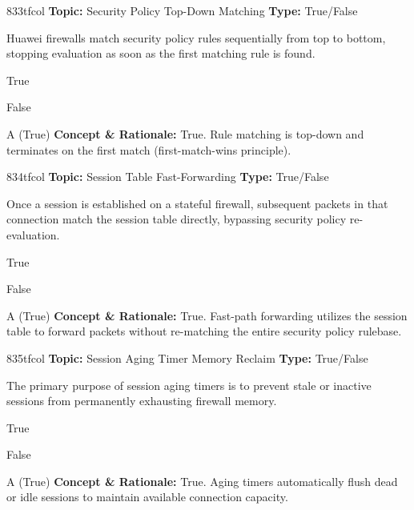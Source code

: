 \begin{qcard}{833}{tfcol}
\textcolor{darkslate!75}{\small\textbf{Topic:} Security Policy Top-Down Matching \hfill \textbf{Type:} True/False}\vspace{0.4em}\par
Huawei firewalls match security policy rules sequentially from top to bottom, stopping evaluation as soon as the first matching rule is found.
\begin{qoptions}
\item True
\item False
\end{qoptions}
\end{qcard}
\nopagebreak
\begin{explainbox}{A (True)}
\textbf{Concept \& Rationale:} True. Rule matching is top-down and terminates on the first match (first-match-wins principle).
\end{explainbox}

\begin{qcard}{834}{tfcol}
\textcolor{darkslate!75}{\small\textbf{Topic:} Session Table Fast-Forwarding \hfill \textbf{Type:} True/False}\vspace{0.4em}\par
Once a session is established on a stateful firewall, subsequent packets in that connection match the session table directly, bypassing security policy re-evaluation.
\begin{qoptions}
\item True
\item False
\end{qoptions}
\end{qcard}
\nopagebreak
\begin{explainbox}{A (True)}
\textbf{Concept \& Rationale:} True. Fast-path forwarding utilizes the session table to forward packets without re-matching the entire security policy rulebase.
\end{explainbox}

\begin{qcard}{835}{tfcol}
\textcolor{darkslate!75}{\small\textbf{Topic:} Session Aging Timer Memory Reclaim \hfill \textbf{Type:} True/False}\vspace{0.4em}\par
The primary purpose of session aging timers is to prevent stale or inactive sessions from permanently exhausting firewall memory.
\begin{qoptions}
\item True
\item False
\end{qoptions}
\end{qcard}
\nopagebreak
\begin{explainbox}{A (True)}
\textbf{Concept \& Rationale:} True. Aging timers automatically flush dead or idle sessions to maintain available connection capacity.
\end{explainbox}

